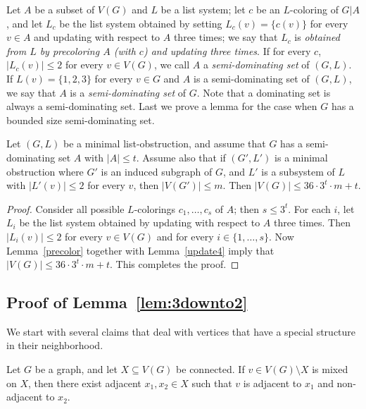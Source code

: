\documentclass[11pt]{article}
\begin{document}
Let $A$ be a subset of $V(G)$ and $L$ be a list system; let $c$ be an $L$-coloring of $G|A$, and let $L_c$ be the list system obtained by setting $L_c(v)=\{c(v)\} $ for every $v\in A$ and updating with respect to $A$ three times; we say that $L_c$ is \emph{obtained from $L$ by precoloring $A$ (with $c$)  and updating three times}. If for every $c$, $|L_c(v)|\leq 2$ for every $v\in V(G)$, we call $A$ a \emph{semi-dominating set} of $(G,L)$. If $L(v)=\{1,2,3\}$ for every $ v\in G $ and $A$ is a semi-dominating set of $(G,L)$, we say that $A$ is a \emph{semi-dominating set} of $G$.  Note that a dominating set is always a semi-dominating set.
Last we prove a lemma for the case when $G$ has a bounded size semi-dominating set.

\begin{lemma}\label{P_4}
	Let $(G,L)$ be a minimal list-obstruction, and assume that $G$ has a semi-dominating set $A$ with $|A| \leq t$. Assume also that if $(G',L')$ is a minimal 
	obstruction where $G'$ is an induced subgraph of 
	$G$, and $L'$ is a subsystem of $L$ with $|L'(v)| \leq 2$ for every $v$, then
	$|V(G')| \leq m$.  Then $|V(G)| \leq 36\cdot 3^t \cdot m +t$.
\end{lemma}
\begin{proof}
	Consider all possible $L$-colorings $c_1, \ldots, c_s$ of $A$; then 
	$s \leq 3^t$. For each $i$, let $L_i$ be the list system obtained by updating 
	with respect to $A$ three times. Then  $|L_i(v)| \leq 2$ for every $v \in V(G)$ and
	for every $i \in \{1, \ldots, s\}$.  Now Lemma~\ref{precolor} together with Lemma~\ref{update4} imply that 
	$|V(G)| \leq 36\cdot 3^t \cdot m +t$. This completes the proof.
\end{proof}

\subsection{Proof of Lemma~\ref{lem:3downto2}}\label{sec:generalcase}



We start with several claims that deal with vertices that have a special structure in their neighborhood.

\begin{claim}\label{mixed}
Let $G$ be a graph, and let $X \subseteq V(G)$ be connected. If $v \in V(G) \setminus X$ is mixed on $X$, then there exist adjacent $x_1,x_2 \in X$ such that
$v$ is adjacent to $x_1$ and non-adjacent to $x_2$.
\end{claim}
\end{document}
